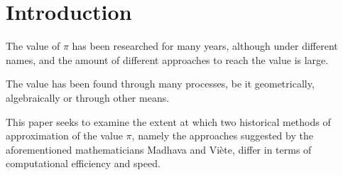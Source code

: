 \section{Introduction}


The value of $\pi$ has been researched for many years, although under different names,
and the amount of different approaches to reach the value is large. 

The value has been found through many processes, be it geometrically, algebraically 
or through other means. 

This paper seeks to examine the extent at which two historical methods of
approximation of the value $\pi$, namely the approaches suggested by the aforementioned 
mathematicians Madhava and Viète, differ in terms of computational efficiency and 
speed. 

